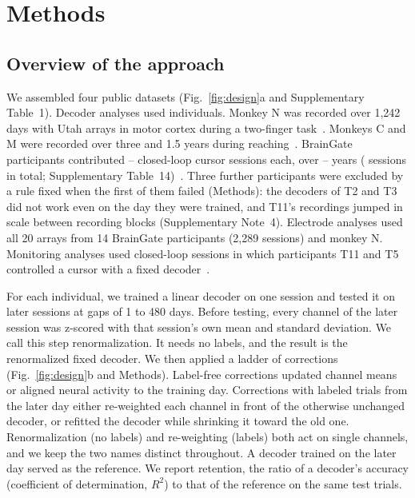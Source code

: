 \documentclass{iopjournal}
\begin{document}
\section{Methods}
\subsection{Overview of the approach}
We assembled four public datasets (Fig.~\ref{fig:design}a and Supplementary Table~1). Decoder analyses used
 individuals. Monkey N was recorded over 1,242 days with Utah arrays in motor cortex during a two-finger
task~\cite{temmar2025,nason2021,willsey2022}. Monkeys C and M were recorded over three and 1.5 years during
reaching~\cite{gallego2020,perich2018}. BrainGate participants  contributed --
closed-loop cursor sessions each, over -- years ( sessions in
total; Supplementary Table~14)~\cite{hahn2026}. Three further participants were excluded by a rule fixed when the first of
them failed (Methods): the decoders of T2 and T3 did not work even on the day they were trained, and T11's recordings jumped in scale
between recording blocks (Supplementary Note~4). Electrode analyses used all 20 arrays from 14 BrainGate
participants (2,289 sessions) and monkey N. Monitoring analyses used closed-loop sessions in which participants T11
and T5 controlled a cursor with a fixed decoder~\cite{pun2024}.

For each individual, we trained a linear decoder on one session and tested it on later sessions at gaps of 1 to 480
days. Before testing, every channel of the later session was z-scored with that session's own mean and standard
deviation. We call this step renormalization. It needs no labels, and the result is the renormalized fixed decoder. We
then applied a ladder of corrections (Fig.~\ref{fig:design}b and Methods). Label-free corrections updated channel means
or aligned neural activity to the training day. Corrections with labeled trials from the later day either re-weighted
each channel in front of the otherwise unchanged decoder, or refitted the decoder while shrinking it toward the old one.
Renormalization (no labels) and re-weighting (labels) both act on single channels, and we keep the two names distinct
throughout. A decoder trained on the later day served as the reference. We report retention, the ratio of a decoder's
accuracy (coefficient of determination, $R^2$) to that of the reference on the same test trials.
\end{document}
